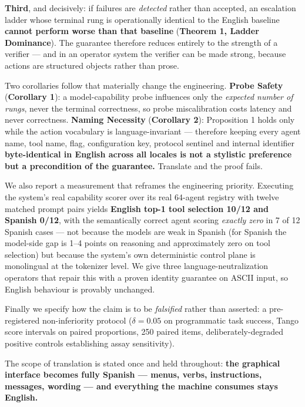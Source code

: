 \textbf{Third}, and decisively: if failures are \emph{detected} rather than accepted, an escalation ladder whose terminal rung is operationally identical to the English baseline \textbf{cannot perform worse than that baseline} (\textbf{Theorem 1, Ladder Dominance}). The guarantee therefore reduces entirely to the strength of a verifier --- and in an operator system the verifier can be made strong, because actions are structured objects rather than prose.

Two corollaries follow that materially change the engineering. \textbf{Probe Safety} (\textbf{Corollary 1}): a model-capability probe influences only the \emph{expected number of rungs}, never the terminal correctness, so probe miscalibration costs latency and never correctness. \textbf{Naming Necessity} (\textbf{Corollary 2}): Proposition 1 holds only while the action vocabulary is language-invariant --- therefore keeping every agent name, tool name, flag, configuration key, protocol sentinel and internal identifier \textbf{byte-identical in English across all locales is not a stylistic preference but a precondition of the guarantee.} Translate  and the proof fails.

We also report a measurement that reframes the engineering priority. Executing the system's real capability scorer over its real 64-agent registry with twelve matched prompt pairs yields \textbf{English top-1 tool selection 10/12 and Spanish 0/12}, with the semantically correct agent scoring \emph{exactly zero} in 7 of 12 Spanish cases --- not because the models are weak in Spanish (for Spanish the model-side gap is 1--4 points on reasoning and approximately zero on tool selection) but because the system's own deterministic control plane is monolingual at the tokenizer level. We give three language-neutralization operators that repair this with a proven identity guarantee on ASCII input, so English behaviour is provably unchanged.

Finally we specify how the claim is to be \emph{falsified} rather than asserted: a pre-registered non-inferiority protocol ($\delta = 0.05$ on programmatic task success, Tango score intervals on paired proportions, 250 paired items, deliberately-degraded positive controls establishing assay sensitivity).

\begin{keyinsight}
The scope of translation is stated once and held throughout: \textbf{the graphical interface becomes fully Spanish --- menus, verbs, instructions, messages, wording --- and everything the machine consumes stays English.}
\end{keyinsight}
